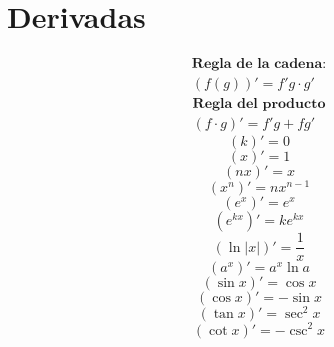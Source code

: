 \documentclass[a4paper,12pt,numbers=noenddot]{scrreprt}
\begin{document}
\section*{Derivadas}
        \begin{center} 
    \begin{multicols}{4}
        \begin{align*}       
        \textbf{Regla de la cadena:}\\ (f(g))' = f'g \cdot g'
        \end{align*}
        \begin{align*}       
            \textbf{Regla del producto}\\ (f \cdot g)' = f'g + fg'
        \end{align*}
        \begin{equation*}
            (k)' = 0
        \end{equation*}
        \begin{equation*}
            (x)' = 1
        \end{equation*}
        \begin{equation*}
            (n x)' = x
        \end{equation*}
        \begin{equation*}
            (x^n)' = nx^{n-1}
        \end{equation*}
        \begin{equation*}
            (e^x)' = e^x
        \end{equation*}
        \begin{equation*}
            (e^{kx})' = ke^{kx}
        \end{equation*}
        \begin{equation*}
            (\ln |x|)' = \frac{1}{x}
        \end{equation*}
        \begin{equation*}
            (a^x)' = a^x \ln a
        \end{equation*}
        \begin{equation*}
            (\sin x)' = \cos x
        \end{equation*}
        \begin{equation*}
            (\cos x)' = -\sin x
        \end{equation*}
        \begin{equation*}
            (\tan x)' = \sec^2 x
        \end{equation*}
        \begin{equation*}
            (\cot x)' = -\csc^2 x

\end{equation*}
\end{multicols}
\end{center}
\end{document}
